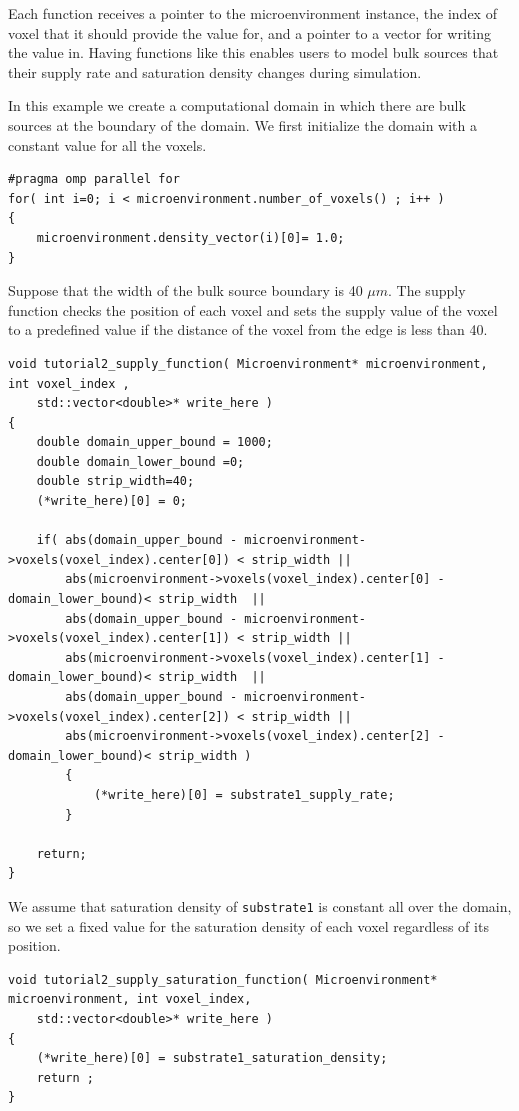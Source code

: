 \documentclass[11pt]{article}
\begin{document}
Each function receives a pointer to the microenvironment instance, the index of voxel that it should provide the value for, and a pointer to
a vector for writing the value in. Having functions like this enables users to model bulk sources that their supply rate and saturation density
changes during simulation.

In this example we create a computational domain in which there are bulk sources at the boundary of the domain. We first initialize the domain
with a constant value for all the voxels.

\begin{verbatim}
#pragma omp parallel for
for( int i=0; i < microenvironment.number_of_voxels() ; i++ )
{
    microenvironment.density_vector(i)[0]= 1.0;
}
\end{verbatim}

Suppose that the width of the bulk source boundary is 40 $\mu m$. The supply function checks the position of each voxel
and sets the supply value of the voxel to a predefined value if the distance of the voxel from the edge is less than 40.

\begin{verbatim}
void tutorial2_supply_function( Microenvironment* microenvironment, int voxel_index ,
    std::vector<double>* write_here )
{
    double domain_upper_bound = 1000;
    double domain_lower_bound =0;
    double strip_width=40;
    (*write_here)[0] = 0;

    if( abs(domain_upper_bound - microenvironment->voxels(voxel_index).center[0]) < strip_width ||
        abs(microenvironment->voxels(voxel_index).center[0] - domain_lower_bound)< strip_width  ||
        abs(domain_upper_bound - microenvironment->voxels(voxel_index).center[1]) < strip_width ||
        abs(microenvironment->voxels(voxel_index).center[1] - domain_lower_bound)< strip_width  ||
        abs(domain_upper_bound - microenvironment->voxels(voxel_index).center[2]) < strip_width ||
        abs(microenvironment->voxels(voxel_index).center[2] - domain_lower_bound)< strip_width )
        {
            (*write_here)[0] = substrate1_supply_rate;
        }
        		
    return;
}
\end{verbatim}

We assume that saturation density of \verb:substrate1: is constant all over the domain, so we set a fixed value for the
saturation density of each voxel regardless of its position.

\begin{verbatim}
void tutorial2_supply_saturation_function( Microenvironment* microenvironment, int voxel_index,
    std::vector<double>* write_here )
{
    (*write_here)[0] = substrate1_saturation_density; 	
    return ;
}
\end{verbatim}
\end{document}
